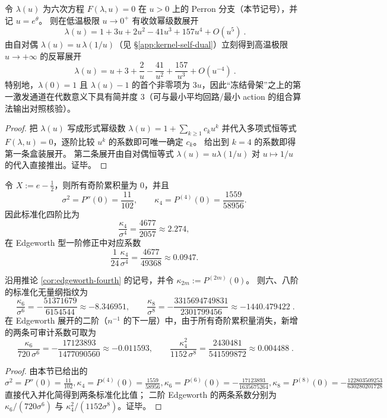 

\begin{proposition}\label{prop:lambda-extreme-asymp}
令 \(\lambda(u)\) 为六次方程 \(F(\lambda,u)=0\) 在 \(u>0\) 上的 Perron 分支（本节记号），并记 \(u=e^\theta\)。
则在低温极限 \(u\to 0^+\) 有收敛幂级数展开
\[
\boxed{\ \lambda(u)=1+3u+2u^2-41u^3+157u^4+O(u^5)\ }.
\]
由自对偶 \(\lambda(u)=u\,\lambda(1/u)\)（见 \S\ref{app:kernel-self-dual}）立刻得到高温极限 \(u\to+\infty\) 的反幂展开
\[
\boxed{\ \lambda(u)=u+3+\frac{2}{u}-\frac{41}{u^2}+\frac{157}{u^3}+O(u^{-4})\ }.
\]
特别地，\(\lambda(0)=1\) 且 \(\lambda(u)-1\) 的首个非零项为 \(3u\)，因此“冻结骨架”之上的第一激发通道在代数意义下具有简并度 \(3\)（可与最小平均回路/最小 action 的组合算法输出对照核验）。
\end{proposition}
\begin{proof}
把 \(\lambda(u)\) 写成形式幂级数
\(
\lambda(u)=1+\sum_{k\ge 1}c_k u^k
\)
并代入多项式恒等式 \(F(\lambda,u)=0\)，逐阶比较 \(u^k\) 的系数即可唯一确定 \(c_k\)。
给出到 \(k=4\) 的系数即得第一条盒装展开。
第二条展开由自对偶恒等式 \(\lambda(u)=u\lambda(1/u)\) 对 \(u\mapsto 1/u\) 的代入直接推出。证毕。
\end{proof}

\begin{corollary}[中心化后的四阶修正系数]\label{cor:edgeworth-fourth}
令 $X:=e-\frac12$，则所有奇阶累积量为 $0$，并且
\[
\sigma^2=P''(0)=\frac{11}{102},\qquad
\kappa_4=P^{(4)}(0)=\frac{1559}{58956}.
\]
因此标准化四阶比为
\[
\frac{\kappa_4}{\sigma^4}=\frac{4677}{2057}\approx 2.274,
\]
在 Edgeworth 型一阶修正中对应系数
\[
\frac{1}{24}\frac{\kappa_4}{\sigma^4}=\frac{4677}{49368}\approx 0.0947.
\]
\end{corollary}

\begin{corollary}\label{cor:edgeworth-six-eight}
沿用推论 \ref{cor:edgeworth-fourth} 的记号，并令
\(
\kappa_{2m}:=P^{(2m)}(0)
\)。
则六、八阶的标准化无量纲指纹为
$$
\boxed{\;
\frac{\kappa_6}{\sigma^6}=-\frac{51371679}{6154544}\approx -8.346951,
\qquad
\frac{\kappa_8}{\sigma^8}=-\frac{3315694749831}{2301799456}\approx -1440.479422\; }.
$$
在 Edgeworth 展开的二阶（\(n^{-1}\) 的下一层）中，由于所有奇阶累积量消失，新增的两条可审计系数可取为
$$
\boxed{\;
\frac{\kappa_6}{720\,\sigma^6}=-\frac{17123893}{1477090560}\approx -0.011593,
\qquad
\frac{\kappa_4^2}{1152\,\sigma^8}=\frac{2430481}{541599872}\approx 0.004488\; }.
$$
\end{corollary}
\begin{proof}
由本节已给出的
\(
\sigma^2=P''(0)=\frac{11}{102},
\kappa_4=P^{(4)}(0)=\frac{1559}{58956},
\kappa_6=P^{(6)}(0)=-\frac{17123893}{1635675264},
\kappa_8=P^{(8)}(0)=-\frac{122803509253}{630280201728}
\)
直接代入并化简得到两条标准化比值；
二阶 Edgeworth 的两条系数分别为 \(\kappa_6/(720\sigma^6)\) 与 \(\kappa_4^2/(1152\sigma^8)\)。证毕。
\end{proof}

